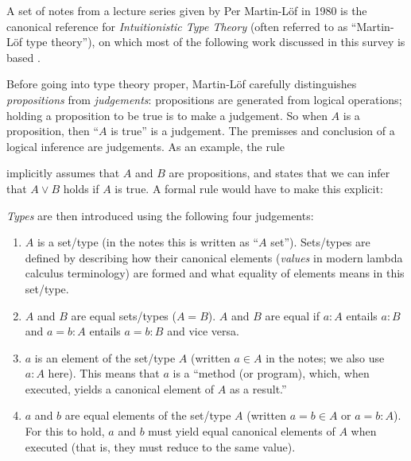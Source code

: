 \documentclass[12pt,toc=bibliography,numbers=noendperiod,
               footnotes=multiple,twoside]{scrartcl}
\begin{document}
A set of notes from a lecture series given by Per Martin-Löf in 1980 is the canonical reference for \emph{Intuitionistic Type Theory} (often referred to as \enquote{Martin-Löf type theory}), on which most of the following work discussed in this survey is based \autocite{sambin_intuitionistic_1984}.

Before going into type theory proper, Martin-Löf carefully distinguishes \emph{propositions} from \emph{judgements}: propositions are generated from logical operations; holding a proposition to be true is to make a judgement. So when \(A\) is a proposition, then \enquote{\(A\) is true} is a judgement. The premisses and conclusion of a logical inference are judgements. As an example, the rule

\begin{prooftree}
\end{prooftree}

implicitly assumes that \(A\) and \(B\) are propositions, and states that we can infer that \(A \vee B\) holds if \(A\) is true. A formal rule would have to make this explicit:

\begin{prooftree}
\end{prooftree}

\emph{Types} are then introduced using the following four judgements:

\begin{enumerate}
\item \(A\) is a set/type (in the notes this is written as \enquote{\(A\) set}). Sets/types are defined by describing how their canonical elements (\emph{values} in modern lambda calculus terminology) are formed and what equality of elements means in this set/type.
\item \(A\) and \(B\) are equal sets/types (\(A = B\)). \(A\) and \(B\) are equal if \(a : A\) entails \(a : B\) and \(a = b : A\) entails \(a = b : B\) and vice versa.
\item \(a\) is an element of the set/type \(A\) (written \(a \in A\) in the notes; we also use \(a : A\) here). This means that \(a\) is a \enquote{method (or program), which, when executed, yields a canonical element of \(A\) as a result.}
\item \(a\) and \(b\) are equal elements of the set/type \(A\) (written \(a = b \in A\) or \(a = b : A\)). For this to hold, \(a\) and \(b\) must yield equal canonical elements of \(A\) when executed (that is, they must reduce to the same value).
\end{enumerate}
\end{document}
